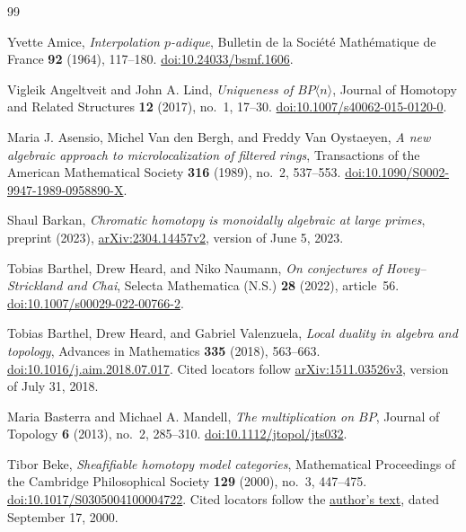 {}
\begin{thebibliography}{99}
\raggedright

Yvette Amice,
\emph{Interpolation $p$-adique},
Bulletin de la Soci\'et\'e Math\'ematique de France \textbf{92} (1964),
117--180.
\href{https://doi.org/10.24033/bsmf.1606}{doi:10.24033/bsmf.1606}.

Vigleik Angeltveit and John A. Lind,
\emph{Uniqueness of $BP\langle n\rangle$},
Journal of Homotopy and Related Structures \textbf{12} (2017),
no.~1, 17--30.
\href{https://doi.org/10.1007/s40062-015-0120-0}{doi:10.1007/s40062-015-0120-0}.

Maria J. Asensio, Michel Van den Bergh, and Freddy Van Oystaeyen,
\emph{A new algebraic approach to microlocalization of filtered rings},
Transactions of the American Mathematical Society \textbf{316} (1989),
no.~2, 537--553.
\href{https://doi.org/10.1090/S0002-9947-1989-0958890-X}{doi:10.1090/S0002-9947-1989-0958890-X}.

Shaul Barkan,
\emph{Chromatic homotopy is monoidally algebraic at large primes},
preprint (2023),
\href{https://arxiv.org/abs/2304.14457v2}{arXiv:2304.14457v2},
version of June 5, 2023.

Tobias Barthel, Drew Heard, and Niko Naumann,
\emph{On conjectures of Hovey--Strickland and Chai},
Selecta Mathematica (N.S.) \textbf{28} (2022), article~56.
\href{https://doi.org/10.1007/s00029-022-00766-2}{doi:10.1007/s00029-022-00766-2}.

Tobias Barthel, Drew Heard, and Gabriel Valenzuela,
\emph{Local duality in algebra and topology},
Advances in Mathematics \textbf{335} (2018), 563--663.
\href{https://doi.org/10.1016/j.aim.2018.07.017}{doi:10.1016/j.aim.2018.07.017}.
Cited locators follow
\href{https://arxiv.org/abs/1511.03526v3}{arXiv:1511.03526v3},
version of July 31, 2018.

Maria Basterra and Michael A. Mandell,
\emph{The multiplication on $BP$},
Journal of Topology \textbf{6} (2013), no.~2, 285--310.
\href{https://doi.org/10.1112/jtopol/jts032}{doi:10.1112/jtopol/jts032}.

Tibor Beke,
\emph{Sheafifiable homotopy model categories},
Mathematical Proceedings of the Cambridge Philosophical Society
\textbf{129} (2000), no.~3, 447--475.
\href{https://doi.org/10.1017/S0305004100004722}{doi:10.1017/S0305004100004722}.
Cited locators follow the
\href{https://faculty.uml.edu/tbeke/sheafi.pdf}{author's text},
dated September 17, 2000.


\end{thebibliography}
